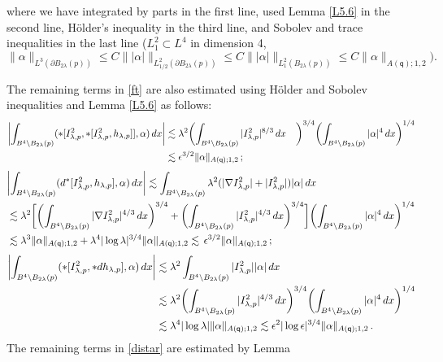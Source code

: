 \documentclass[11pt]{article}
\numberwithin{equation}{section} \setlength{\topmargin}{-35pt}
\newcommand{\q}{\mathsf{q}}
\begin{document}
where we have integrated by parts in the first line, used Lemma
\ref{L5.6} in the second line, H\"older's inequality in the third
line, and Sobolev and trace inequalities in the last line
($L^2_1\subset L^4$ in dimension  4, $\|\alpha\|_{L^3(\partial
B_{2\lambda}(p))}\le C\||\alpha|\|_{L^2_{1/2}(\partial
B_{2\lambda}(p))}\le C\||\alpha|\|_{L^2_1(B_{2\lambda}(p))}\le
C\|\alpha\|_{A(\q);1,2}).$

The remaining terms in \eqref{ft} are also estimated using H\"older
and Sobolev inequalities and Lemma \ref{L5.6} as follows:
\begin{align}
\biggl|\int_{B^4\setminus
B_{2\lambda}(p)}(\ast[I^2_{\lambda,p},\ast[I^2_{\lambda,p},h_{\lambda,p}]],\alpha)\,dx
\biggr|&\lesssim\lambda^2\biggl(\int_{B^4\setminus
B_{2\lambda}(p)}|I^2_{\lambda,p}|^{8/3}\,dx&\biggr)^{3/4}
\biggl(\int_{B^4\setminus B_{2\lambda}(p)}|\alpha|^4\,dx\biggr)^{1/4}\notag\\
 &\lesssim\epsilon^{3/2}\|\alpha\|_{A(\q);1,2}\,;
\end{align}
\begin{align}
 &\biggl|\int_{B^4\setminus
B_{2\lambda}(p)}(d^{\ast}[I^2_{\lambda,p},h_{\lambda,p}],\alpha)\,dx
\bigg|\lesssim\int_{B^4\setminus B_{2\lambda}(p)}\lambda^2(|\nabla I^2_{\lambda,p}|+|I^2_{\lambda,p}|)|\alpha|\,dx\notag\\
 &\lesssim\lambda^2\biggl[\biggl(\int_{B^4\setminus B_{2\lambda}(p)}|\nabla I^2_{\lambda,p}|^{4/3}\,dx\biggr)^{3/4}
+\biggl(\int_{B^4\setminus
B_{2\lambda}(p)}|I^2_{\lambda,p}|^{4/3}\,dx\biggr)^{3/4}\biggr]
\biggl(\int_{B^4\setminus B_{2\lambda}(p)}|\alpha|^4\,dx\biggr)^{1/4}\notag\\
&\lesssim\lambda^3\|\alpha\|_{A(\q);1,2}+\lambda^4|\log\lambda|^{3/4}\|\alpha\|_{A(\q);1,2}
\lesssim \,\epsilon^{3/2}\|\alpha\|_{A(\q);1,2}\,;
\end{align}
\begin{align}
 \biggl|\int_{B^4\setminus
B_{2\lambda}(p)}(\ast[I^2_{\lambda,p},\ast
dh_{\lambda,p}],\alpha)\,dx \biggl|
&\lesssim\lambda^2\int_{B^4\setminus B_{2\lambda}(p)}|I^2_{\lambda,p}||\alpha|\,dx\notag\\
 &\lesssim\lambda^2\biggl(\int_{B^4\setminus B_{2\lambda}(p)}|I^2_{\lambda,p}|^{4/3}\,dx\biggr)^{3/4}
\biggl(\int_{B^4\setminus B_{2\lambda}(p)}|\alpha|^4\,dx\biggr)^{1/4}\notag\\
 &\lesssim\lambda^4|\log\lambda|\|\alpha\|_{A(\q);1,2}\lesssim\epsilon^2|\log\epsilon|^{3/4}\|\alpha\|_{A(\q);1,2}\,.
\end{align}
The remaining terms in \eqref{distar} are estimated by Lemma
\end{document}
